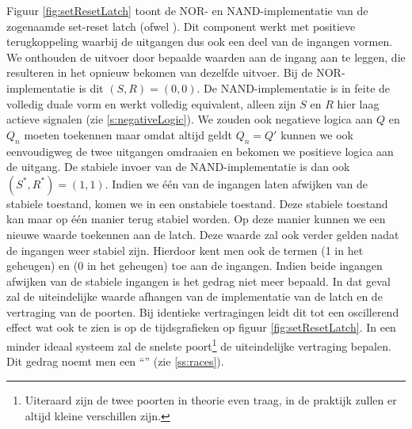 Figuur \ref{fig:setResetLatch} toont de NOR- en NAND-implementatie van de zogenaamde set-reset latch (ofwel ). Dit component werkt met positieve terugkoppeling waarbij de uitgangen dus ook een deel van de ingangen vormen. We onthouden de uitvoer door bepaalde waarden aan de ingang aan te leggen, die resulteren in het opnieuw bekomen van dezelfde uitvoer. Bij de NOR-implementatie is dit $\left(S,R\right)=\left(0,0\right)$. De NAND-implementatie is in feite de volledig duale vorm en werkt volledig equivalent, alleen zijn $S$ en $R$ hier laag actieve signalen (zie \ref{s:negativeLogic}). We zouden ook negatieve logica aan $Q$ en $Q_n$ moeten toekennen maar omdat altijd geldt $Q_n=Q'$ kunnen we ook eenvoudigweg de twee uitgangen omdraaien en bekomen we positieve logica aan de uitgang. De stabiele invoer van de NAND-implementatie is dan ook $\left(S^*,R^*\right)=\left(1,1\right)$. Indien we \'e\'en van de ingangen laten afwijken van de stabiele toestand, komen we in een onstabiele toestand. Deze stabiele toestand kan maar op \'e\'en manier terug stabiel worden. Op deze manier kunnen we een nieuwe waarde toekennen aan de latch. Deze waarde zal ook verder gelden nadat de ingangen weer stabiel zijn. Hierdoor kent men ook de termen  (1 in het geheugen) en  (0 in het geheugen) toe aan de ingangen. Indien beide ingangen afwijken van de stabiele ingangen is het gedrag niet meer bepaald. In dat geval zal de uiteindelijke waarde afhangen van de implementatie van de latch en de vertraging van de poorten. Bij identieke vertragingen leidt dit tot een oscillerend effect wat ook te zien is op de tijdsgrafieken op figuur \ref{fig:setResetLatch}. In een minder ideaal systeem zal de snelste poort\footnote{Uiteraard zijn de twee poorten in theorie even traag, in de praktijk zullen er altijd kleine verschillen zijn.} de uiteindelijke vertraging bepalen. Dit gedrag noemt men een ``'' (zie \ref{ss:races}).
